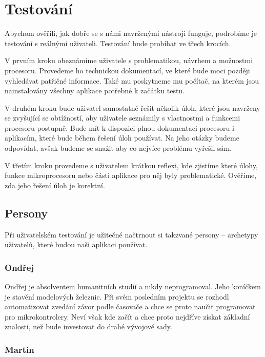 \chapter{Testování}

Abychom ověřili, jak dobře se s námi navrženými nástroji funguje, podrobíme je testování s reálnými uživateli. Testování bude probíhat ve třech krocích.

V prvním kroku obeznámíme uživatele s problematikou, návrhem a možnostmi procesoru. Provedeme ho technickou dokumentací, ve které bude moci později vyhledávat patřičné informace. Také mu poskytneme mu počítač, na kterém jsou nainstalovány všechny aplikace potřebné k začátku testu.

V druhém kroku bude uživatel samostatně řešit několik úloh, které jsou navrženy se zvyšující se obtížností, aby uživatele seznámily s vlastnostmi a funkcemi procesoru postupně. Bude mít k dispozici plnou dokumentaci procesoru i aplikacím, které bude během řešení úloh používat. Na jeho otázky budeme odpovídat, avšak budeme se snažit aby co nejvíce problému vyřešil sám.

V třetím kroku provedeme s uživatelem krátkou reflexi, kde zjistíme které úlohy, funkce mikroprocesoru nebo části aplikace pro něj byly problematické. Ověříme, zda jeho řešení úloh je korektní.

\section{Persony}

Při uživatelském testování je užitečné načtrnout si takzvané persony -- archetypy uživatelů, které budou naši aplikaci používat.

\subsection{Ondřej}

Ondřej je absolventem humanitních studií a nikdy neprogramoval. Jeho koníčkem je stavění modelových železnic. Při svém posledním projektu se rozhodl automatizovat zvedání závor podle časovače a chce se proto naučit programovat pro mikrokontrolery. Neví však kde začít a chce proto nejdříve získat základní znalosti, než bude investovat do drahé vývojové sady.

\subsection{Martin}

